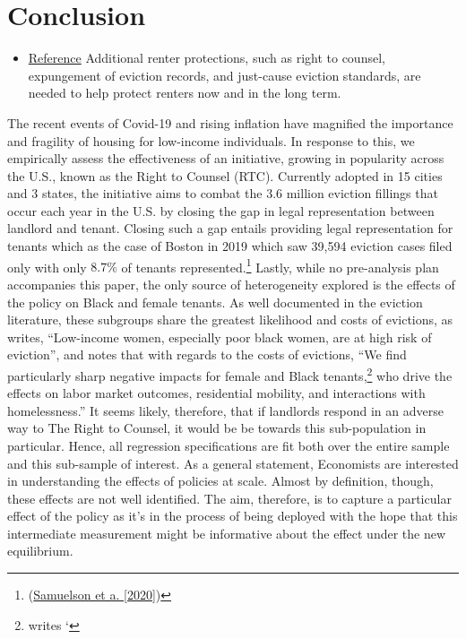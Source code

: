 \documentclass[a4paper,12pt]{article}
\begin{document}
\section{Conclusion}
\begin{itemize}
    \item \href{https://nlihc.org/sites/default/files/Overview-of-National-Eviction-Moratorium.pdf}{Reference} Additional renter protections, such as right to counsel, expungement of eviction records, and just-cause
eviction standards, are needed to help protect renters now and in the long term.
\end{itemize}
The recent events of Covid-19 and rising inflation have magnified the importance and fragility of housing for low-income individuals. In response to this, we empirically assess the effectiveness of an initiative, growing in popularity across the U.S., known as the Right to Counsel (RTC). Currently adopted in 15 cities and 3 states, the initiative aims to combat the 3.6 million eviction fillings that occur each year in the U.S. by closing the gap in legal representation between landlord and tenant. Closing such a gap entails providing legal representation for tenants which as the case of Boston in 2019 which saw 39,594 eviction cases filed only  with only $8.7\%$ of tenants represented.\footnote{(\href{https://bostonbar.org/app/uploads/2022/06/rtc-report-for-web-or-email.pdf}{Samuelson et a. [2020]})}
Lastly, while no pre-analysis plan accompanies this paper, the only source of heterogeneity explored is the effects of the policy on Black and female tenants. As well documented in the eviction literature, these subgroups share the greatest likelihood and costs of evictions, as \cite{desmond2019unaffordable} writes, ``Low-income women, especially poor black women, are at high risk of eviction'', and \cite{collinson2022eviction} notes that with regards to the costs of evictions, ``We find particularly sharp negative impacts for female and Black tenants,\footnote{\cite{evans2019reducing} writes `} who drive the effects on labor market outcomes, residential mobility, and interactions with homelessness.'' It seems likely, therefore, that if landlords respond in an adverse way to The Right to Counsel, it would be be towards this sub-population in particular. Hence, all regression specifications are fit both over the entire sample and this sub-sample of interest. 
As a general statement, Economists are interested in understanding the effects of policies at scale. Almost by definition, though, these effects are not well identified. The aim, therefore, is to capture a particular effect of the policy as it's in the process of being deployed with the hope that this intermediate measurement might be informative about the effect under the new equilibrium.\par 
\end{document}

